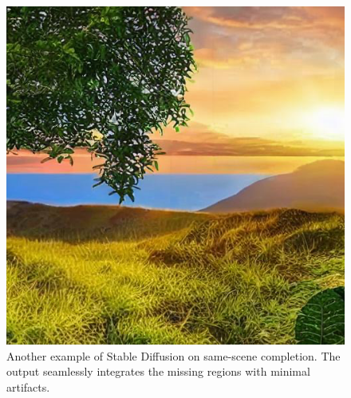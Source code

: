 \documentclass[sigconf]{acmart}
\begin{document}
\begin{figure}[h!]
    \centering
    \includegraphics[width=\linewidth]{stable_diffusion_step_2_2}
    \caption{Another example of Stable Diffusion on same-scene completion. The output seamlessly integrates the missing regions with minimal artifacts.}
    \label{fig:stable_diffusion_step_2_2}
\end{figure}
\end{document}
